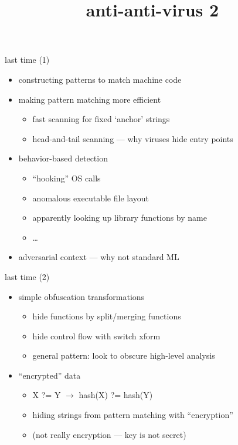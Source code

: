 \graphicspath{{./figures/}}
\title{anti-anti-virus 2}
\date{}

\begin{frame}
    \titlepage
\end{frame}
\usetikzlibrary{arrows.meta,calc,fit,matrix,positioning,shapes.callouts}


\begin{frame}{last time (1)}
    \begin{itemize}
    \item constructing patterns to match machine code
    \item making pattern matching more efficient
        \begin{itemize}
        \item fast scanning for fixed `anchor' strings
        \item head-and-tail scanning --- why viruses hide entry points
        \end{itemize}
    \item behavior-based detection
        \begin{itemize}
        \item ``hooking'' OS calls
        \item anomalous executable file layout
        \item apparently looking up library functions by name
        \item \ldots
        \end{itemize}
    \item adversarial context --- why not standard ML
    \end{itemize}
\end{frame}

\begin{frame}{last time (2)}
    \begin{itemize}
    \item simple obfuscation transformations
        \begin{itemize}
        \item hide functions by split/merging functions
        \item hide control flow with switch xform
        \item general pattern: look to obscure high-level analysis
        \end{itemize}
    \item ``encrypted'' data
        \begin{itemize}
        \item X ?= Y $\rightarrow$ hash(X) ?= hash(Y)
        \item hiding strings from pattern matching with ``encryption''
        \item (not really encryption --- key is not secret)
        \end{itemize}
    \end{itemize}
\end{frame}

